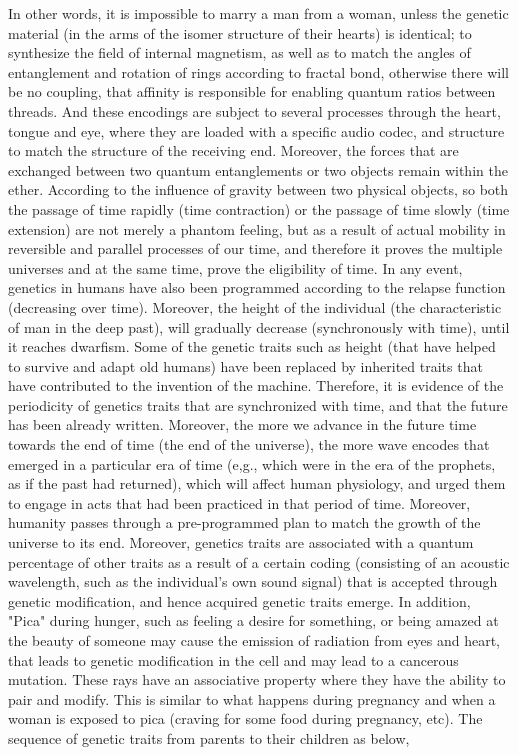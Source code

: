 \begin{Summary}
{{{{In other words, it is impossible to marry a man from a woman, unless the genetic material (in the arms of the isomer structure of their hearts) is identical; to synthesize the field of internal magnetism, as well as to match the angles of entanglement and rotation of rings according to fractal bond, otherwise there will be no coupling, that affinity is responsible for enabling quantum ratios between threads. And these encodings are subject to several processes through the heart, tongue and eye, where they are loaded with a specific audio codec, and structure to match the structure of the receiving end.
Moreover, the forces that are exchanged between two quantum entanglements or two objects remain within the ether.
According to the influence of gravity between two physical objects, so both the passage of time rapidly (time contraction) or the passage of time slowly (time extension) are not merely a phantom feeling, but as a result of actual mobility in reversible and parallel processes of our time, and therefore it proves the multiple universes and at the same time, prove the eligibility of time. In any event, genetics in humans have also been programmed according to the relapse function (decreasing over time). Moreover, the height of the individual (the characteristic of man in the deep past), will gradually decrease (synchronously with time), until it reaches dwarfism. Some of the genetic traits such as height (that have helped to survive and adapt old humans) have been replaced by inherited traits that have contributed to the invention of the machine. Therefore, it is evidence of the periodicity of genetics traits that are synchronized with time, and that the future has been already written. Moreover, the more we advance in the future time towards the end of time (the end of the universe), the more wave encodes that emerged in a particular era of time (e,g., which were in the era of the prophets, as if the past had returned), which will affect human physiology, and urged them to engage in acts that had been practiced in that period of time. Moreover, humanity passes through a pre-programmed plan to match the growth of the universe to its end. Moreover, genetics traits are associated with a quantum percentage of other traits as a result of a certain coding (consisting of an acoustic wavelength, such as the individual's own sound signal) that is accepted through genetic modification, and hence acquired genetic traits emerge. In addition, "Pica" during hunger, such as feeling a desire for something, or being amazed at the beauty of someone may cause the emission of radiation from eyes and heart, that leads to genetic modification in the cell and may lead to a cancerous mutation. These rays have an associative property where they have the ability to pair and modify. This is similar to what happens during pregnancy and when a woman is exposed to pica (craving for some food during pregnancy, etc).  
The sequence of genetic traits from parents to their children as below,

}}}}
\end{Summary}
